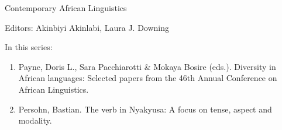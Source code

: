 {\large Contemporary African Linguistics}

\bigskip

Editors: Akinbiyi Akinlabi,  Laura J. Downing  


\bigskip

In this series:

\begin{enumerate}
\item Payne, Doris L., Sara Pacchiarotti \& Mokaya Bosire (eds.). Diversity in African languages: Selected papers from the 46th Annual Conference on African Linguistics.
\item Persohn, Bastian. The verb in Nyakyusa: A focus on tense, aspect and modality.
\end{enumerate}


\vfill

